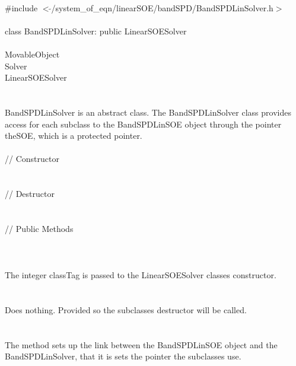 
   \\
\indent \#include $<\tilde{ }$/system\_of\_eqn/linearSOE/bandSPD/BandSPDLinSolver.h$>$  \\

  \\
\indent class BandSPDLinSolver: public LinearSOESolver  \\

 \\
\indent MovableObject \\
\indent\indent  Solver \\
\indent\indent\indent LinearSOESolver \\
\indent\indent\indent{} \\

  \\
\indent BandSPDLinSolver is an abstract class. The BandSPDLinSolver
class provides access for each subclass to the BandSPDLinSOE object
through the pointer \p theSOE, which is a protected pointer. \\

  \\
\indent\indent // Constructor \\
\indent{}  \\ \\
\indent\indent // Destructor \\
\indent{}\\  \\
\indent\indent // Public Methods \\
\indent{} \\

  \\
  \\
The integer \p classTag is passed to the LinearSOESolver classes
constructor. \\ 

 \\
\\ 
Does nothing. Provided so the subclasses destructor will be called. \\

  \\
 \\
The method sets up the link between the BandSPDLinSOE object and the
BandSPDLinSolver, that it is sets the pointer the subclasses use.  \\





